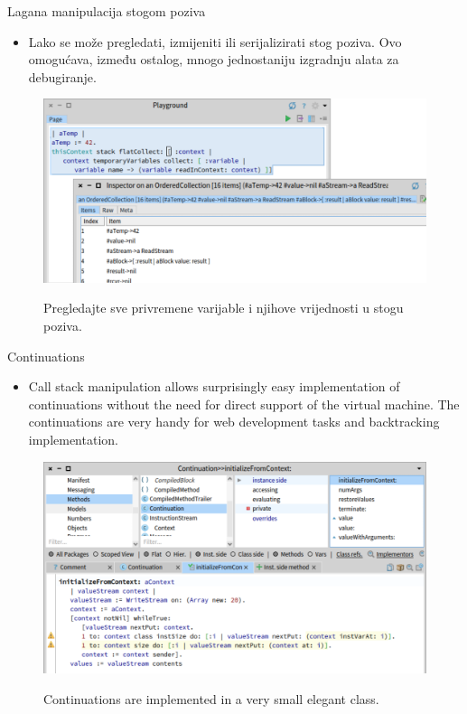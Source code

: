 \documentclass{beamer}
\begin{document}
\begin{frame}{Lagana manipulacija stogom poziva}
\begin{itemize}
    \item Lako se može pregledati, izmijeniti ili serijalizirati stog poziva. Ovo omogućava, između ostalog, mnogo jednostaniju izgradnju alata za debugiranje.
\end{itemize}
\begin{figure}
    \centering
    \includegraphics[width=0.8\linewidth]{stack.png}
    \label{fig:stack}
    \caption{Pregledajte sve privremene varijable i njihove vrijednosti u stogu poziva.}
\end{figure}
\end{frame}

\begin{frame}{Continuations}
\begin{itemize}
    \item Call stack manipulation allows surprisingly easy implementation of continuations without the need for direct support of the virtual machine. The continuations are very handy for web development tasks and backtracking implementation.
\end{itemize}
\begin{figure}
    \centering
    \includegraphics[width=0.8\linewidth]{continuation.png}
    \label{fig:continuation}
    \caption{Continuations are implemented in a very small elegant class.}
\end{figure}
\end{frame}
\end{document}
